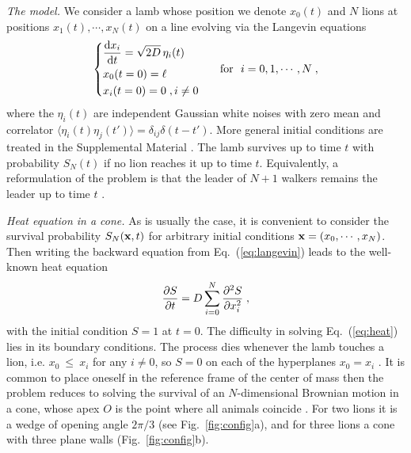\documentclass[aps,prl,twocolumn,superscriptaddress,floatfix,nofootinbib]{revtex4-2}
\begin{document}
\emph{The model.} We consider a lamb whose position we denote $x_0(t)$ and $N$ lions at positions $x_1(t), \cdots, x_N(t)$ on a line evolving via the Langevin equations
\begin{equation} \label{eq:langevin}
    \begin{dcases}
    \dv{x_i}{t} = \sqrt{2 D}\, \eta_i(t) \\
    x_0(t = 0) = \ell\\
    x_i(t = 0) = 0\;, i \neq 0
    \end{dcases}
    \quad \mbox{~~for~~} i = 0, 1, \cdots, N \;,
\end{equation}
where the $\eta_i(t)$ are independent Gaussian white noises with zero mean and correlator $\langle \eta_i(t) \eta_j(t') \rangle = \delta_{ij} \delta(t - t')$. More general initial conditions are treated in the Supplemental Material \cite{SM}. The lamb survives up to time $t$ with probability $S_N(t)$ if no lion reaches it up to time $t$. Equivalently, a reformulation of the problem is that the leader of $N+1$ walkers remains the leader up to time $t$ \cite{bA03,BNK10b}.

\emph{Heat equation in a cone.} As is usually the case, it is convenient to consider the survival probability $S_N(\vb{x}, t)$ for arbitrary initial conditions $\vb{x} = (x_0, \cdots, x_N)$. Then writing the backward equation from Eq.~(\ref{eq:langevin}) leads to the well-known heat equation
\begin{equation} \label{eq:heat}
    \pdv{S}{t} = D \sum_{i = 0}^N \pdv[2]{S}{x_i} \;,
\end{equation}
with the initial condition $S = 1$ at $t = 0$. The difficulty in solving Eq.~(\ref{eq:heat}) lies in its boundary conditions. The process dies whenever the lamb touches a lion, i.e. $x_0~\leq~x_i$ for any $i \neq 0$, so $S = 0$ on each of the hyperplanes $x_0 = x_i$ \cite{RednerBook,RK99}. It is common to place oneself in the reference frame of the center of mass then the problem reduces to solving the survival of an $N$-dimensional Brownian motion in a cone, whose apex $O$ is the point where all animals coincide \cite{DeB87,BS97,bA03}. For two lions it is a wedge of opening angle
$2\pi/3$ (see Fig.~\ref{fig:config}a), and for three lions a cone with three plane walls (Fig.~\ref{fig:config}b). 
\end{document}
